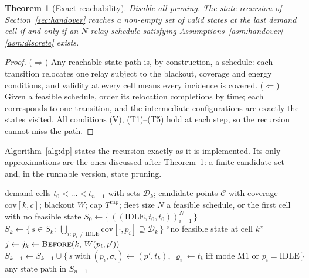 \documentclass[11pt]{article}
\theoremstyle{dshplain}
\newtheorem{theorem}{Theorem}
\theoremstyle{dshdefn}
\begin{document}
\begin{theorem}[Exact reachability]
\label{thm:exact}
Disable all pruning. The state recursion of Section~\ref{sec:handover} reaches a
non-empty set of valid states at the last demand cell if and only if an
$N$-relay schedule satisfying Assumptions~\ref{asm:handover}--\ref{asm:discrete} exists.
\end{theorem}
\begin{proof}
($\Rightarrow$) Any reachable state path is, by construction, a schedule: each
transition relocates one relay subject to the blackout, coverage and energy
conditions, and validity at every cell means every incidence is covered.
($\Leftarrow$) Given a feasible schedule, order its relocation completions by
time; each corresponds to one transition, and the intermediate configurations
are exactly the states visited. All conditions (V), (T1)--(T5) hold at each
step, so the recursion cannot miss the path.
\end{proof}

Algorithm~\ref{alg:dp} states the recursion exactly as it is implemented.
Its only approximations are the ones discussed after Theorem~\ref{thm:exact}:
a finite candidate set and, in the runnable version, state pruning.

\begin{algorithm}[htbp]
\caption{Handover-aware relay feasibility (stated without pruning; the
runnable implementation adds the pruning reported in
Section~\ref{sec:reproducible})}
\label{alg:dp}
\begin{algorithmic}[1]
\Require demand cells $t_0<\dots<t_{n-1}$ with sets $\mathcal{D}_k$; candidate
points $\mathcal{C}$ with coverage $\mathrm{cov}[k,c]$; blackout $W$; cap
$T^{\mathrm{cap}}$; fleet size $N$
\Ensure a feasible schedule, or the first cell with no feasible state
\State $S_0 \gets \bigl\{\,((\mathrm{IDLE},t_0,t_0))_{i=1}^{N}\,\bigr\}$
  \State $S_k \gets \{\,s\in S_k:\ \bigcup_{i:\,p_i\neq\mathrm{IDLE}}\mathrm{cov}[\cdot,p_i]\supseteq\mathcal{D}_k\,\}$ 
   \State \Return ``no feasible state at cell $k$''
  \EndIf
    \State $j \gets j_k \gets \textsc{Before}(k,\,W(p_i,p'))$ 
          \State $S_{k+1}\gets S_{k+1}\cup\{\,s\ \text{with}\ (p_i,\sigma_i)\gets(p',t_k),\ \varrho_i\gets t_k\ \text{iff mode M1 or }p_i=\mathrm{IDLE}\,\}$
        \EndIf
      \EndIf
    \EndIf
  \EndFor
\EndFor
\State \Return any state path in $S_{n-1}$
\end{algorithmic}
\end{algorithm}
\end{document}
